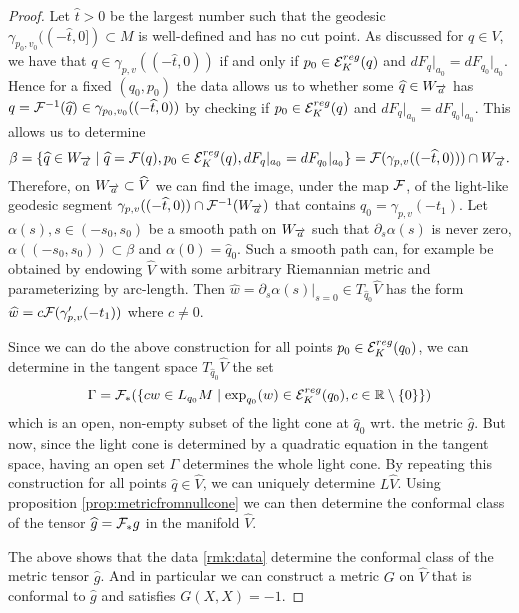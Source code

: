 \begin{proof}
    Let $\widehat{t} >0$ be the largest number such that the geodesic $\gamma_{p_0,v_0}((-\widehat{t},0])\subset M$ is well-defined and has no cut point. As discussed for $q\in V$, we have that $q\in \gamma_{p,v}((-\widehat{t},0))$ if and only if $p_0\in \er(q)$ and $dF_{q}\rvert_{a_0} = dF_{q_0}\rvert_{a_0}$. Hence for a fixed $(q_0,p_0)$ the data allows us to whether some $\widehat{q}\in W_\aa$ has $q=\F^{-1}(\widehat{q}) \in \gamma_{p_0,v_0}((-\widehat{t},0))$ by checking if $p_0\in \er(q)$ and $dF_{q}\rvert_{a_0} = dF_{q_0}\rvert_{a_0}$. This allows us to determine
        \[
        \beta = \{ \widehat{q}\in W_\aa \mid \widehat{q}=\F(q), p_0\in \er(q), dF_{q}\rvert_{a_0} = dF_{q_0}\rvert_{a_0}\} = \F(\gamma_{p,v}((-\widehat{t},0))) \cap W_\aa.
    \]
    Therefore, on $W_\aa\subset \widehat{V}$ we can find the image, under the map $\F$, of the light-like geodesic segment $\gamma_{p,v}((-\widehat{t},0))\cap \F^{-1}(W_\aa)$ that contains $q_0=\gamma_{p,v}(-t_1)$. Let $\alpha(s), s\in (-s_0,s_0)$ be a smooth path on $W_\aa$ such that $\partial_s\alpha(s)$ is never zero, $\alpha((-s_0,s_0))\subset \beta$ and $\alpha(0) = \widehat{q}_0$. Such a smooth path can, for example be obtained by endowing $\widehat{V}$ with some arbitrary Riemannian metric and parameterizing by arc-length. Then $\widehat{w}=\partial_s\alpha(s)\rvert_{s=0}\in T_{\widehat{q}_0}\widehat{V}$ has the form $\widehat{w}=c\F(\gamma'_{p,v}(-t_1))$ where $c\neq 0$. 
    
    Since we can do the above construction for all points $p_0\in \er(q_0)$, we can determine in the tangent space $T_{\widehat{q}_0}\widehat{V}$ the set 
    \[
    \Gamma = \F_*(\{cw\in L_{q_0}M \mid \exp_{q_0}(w) \in \er(q_0), c\in \R\setminus \{0\}\}) 
    \]
    which is an open, non-empty subset of the light cone at $\widehat{q}_0$ wrt. the metric $\widehat{g}$. But now, since the light cone is determined by a quadratic equation in the tangent space, having an open set $\Gamma$ determines the whole light cone. By repeating this construction for all points $\widehat{q}\in \widehat{V}$, we can uniquely determine $L\widehat{V}$. Using proposition \ref{prop:metricfromnullcone} we can then determine the conformal class of the tensor $\widehat{g}=\F_*g$ in the manifold $\widehat{V}$.
    
    The above shows that the data \ref{rmk:data} determine the conformal class of the metric tensor $\widehat{g}$. And in particular we can construct a metric $G$ on $\widehat{V}$ that is conformal to $\widehat{g}$ and satisfies $G(X,X)=-1$.
\end{proof}

